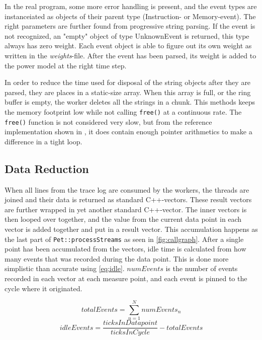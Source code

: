 In the real program, some more error handling is present, and the event types
are instanceiated as objects of their parent type (Instruction- or
Memory-event). The right parameters are further found from progressive string
parsing. If the event is not recognized, an "empty" object of type UnknownEvent
is returned, this type always has zero weight. Each event object is able to
figure out its own weight as written in the \emph{weights}-file. After the
event has been parsed, its weight is added to the power model at the right
time step.

In order to reduce the time used for disposal of the string objects
after they are parsed, they are places in a static-size array. When
this array is full, or the ring buffer is empty, the worker deletes
all the strings in a chunk. This methods keeps the memory footprint
low while not calling \texttt{free()} at a continuous rate. The \texttt{free()}
function is not considered very slow, but from the reference implementation
shown in \cite{kernighan1988c}, it does contain enough pointer
arithmetics to make a difference in a tight loop.

\subsection{Data Reduction}

When all lines from the trace log are consumed by the workers, the threads are
joined and their data is returned as standard C++-vectors. These result vectors
are further wrapped in yet another standard C++-vector. The inner vectors is
then looped over together, and the value from the current data point in each
vector is added together and put in a result vector. This accumulation happens
as the last part of \texttt{Pet::processStreams} as seen in
\autoref{fig:callgraph}. After a single point has been accumulated from the
vectors, idle time is calculated from how many events that was recorded during
the data point. This is done more simplistic than accurate using
\autoref{eq:idle}. $numEvents$ is the number of events recorded in each vector
at each measure point, and each event is pinned to the cycle where it
originated.

\begin{equation}
    totalEvents = \sum_{n=1}^{N} numEvents_n
\end{equation}
\begin{equation}
    idleEvents = \frac{ticksInDatapoint}{ticksInCycle}- totalEvents
\label{eq:idle}
\end{equation}

